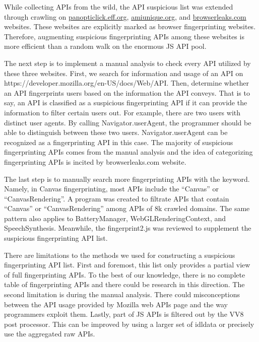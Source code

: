 While collecting APIs from the wild, the API suspicious list was extended through crawling on \url{panopticlick.eff.org}, \url{amiunique.org}, and \url{browserleaks.com} websites. These websites are explicitly marked as browser fingerprinting websites. Therefore, augmenting suspicious fingerprinting APIs among these websites is more efficient than a random walk on the enormous JS API pool.

The next step is to implement a manual analysis to check every API utilized by these three websites. First, we search for information and usage of an API on https://developer.mozilla.org/en-US/docs/Web/API. Then, determine whether an API fingerprints users based on the information the API conveys. That is to say, an API is classified as a suspicious fingerprinting API if it can provide the information to filter certain users out. For example, there are two users with distinct user agents. By calling Navigator.userAgent, the programmer should be able to distinguish between these two users. Navigator.userAgent can be recognized as a fingerprinting API in this case. The majority of suspicious fingerprinting APIs comes from the manual analysis and the idea of categorizing fingerprinting APIs is incited by browserleaks.com website. 

The last step is to manually search more fingerprinting APIs with the keyword. Namely, in Canvas fingerprinting, most APIs include the ``Canvas'' or ``CanvasRendering''. A program was created to filtrate APIs that contain ``Canvas'' or ``CanvasRendering'' among APIs of 8k crawled domains. The same pattern also applies to BatteryManager, WebGLRenderingContext, and SpeechSynthesis. Meanwhile, the fingerprint2.js was reviewed to supplement the suspicious fingerprinting API list.  

There are limitations to the methods we used for constructing a suspicious fingerprinting API list. First and foremost, this list only provides a partial view of full fingerprinting APIs. To the best of our knowledge, there is no complete table of fingerprinting APIs and there could be research in this direction. The second limitation is during the manual analysis. There could misconceptions between the API usage provided by Mozilla web APIs page and the way programmers exploit them. Lastly, part of JS APIs is filtered out by the VV8 post processor. This can be improved by using a larger set of idldata or precisely use the aggregated raw APIs. 
